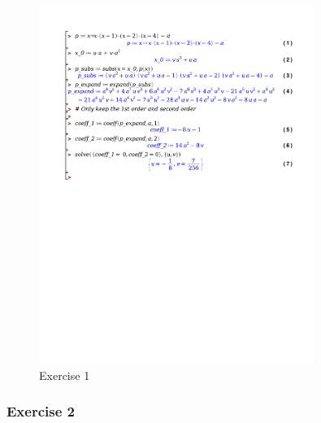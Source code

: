 \documentclass[a4paper]{report}
\begin{document}
\begin{figure}[H]
	\centering
	\includegraphics[width=0.8\textwidth]{./exercises/bordles_1.pdf}
	\caption{Exercise 1}
\end{figure}

\subsubsection{Exercise 2}
\end{document}
